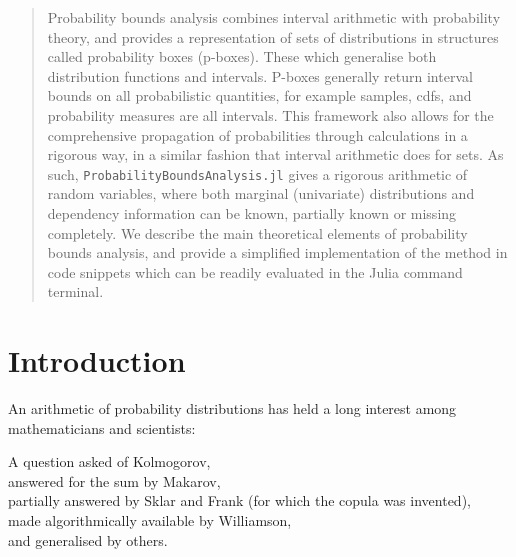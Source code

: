 \documentclass{juliacon}
\begin{document}


\maketitle

\begin{abstract}

Probability bounds analysis combines interval arithmetic with probability theory, and provides a representation of sets of distributions in structures called probability boxes (p-boxes). These which generalise both distribution functions and intervals. P-boxes generally return interval bounds on all probabilistic quantities, for example samples, cdfs, and probability measures are all intervals. This framework also allows for the comprehensive propagation of probabilities through calculations in a rigorous way, in a similar fashion that interval arithmetic does for sets. As such, \texttt{ProbabilityBoundsAnalysis.jl} gives a rigorous arithmetic of random variables, where both marginal (univariate) distributions and dependency information can be known, partially known or missing completely. We describe the main theoretical elements of probability bounds analysis, and provide a simplified implementation of the method in code snippets which can be readily evaluated in the Julia command terminal.

\end{abstract}

\section{Introduction}
\label{sec:intro}

An arithmetic of probability distributions has held a long interest among mathematicians and scientists:
\begin{displayquote}
  A question asked of Kolmogorov, \\
  answered for the sum by Makarov, \\
  partially answered by Sklar and Frank (for which the copula was invented),\\
  made algorithmically available by Williamson, \\
  and generalised by others.
\end{displayquote}
\end{document}
